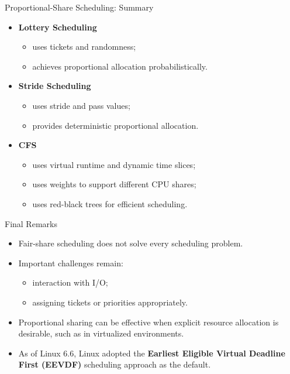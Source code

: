 \begin{frame}{Proportional-Share Scheduling: Summary}
    \begin{itemize}
        \item \textbf{Lottery Scheduling}
        \begin{itemize}
            \item uses tickets and randomness;
            \item achieves proportional allocation probabilistically.
        \end{itemize}

        \item \textbf{Stride Scheduling}
        \begin{itemize}
            \item uses stride and pass values;
            \item provides deterministic proportional allocation.
        \end{itemize}

        \item \textbf{CFS}
        \begin{itemize}
            \item uses virtual runtime and dynamic time slices;
            \item uses weights to support different CPU shares;
            \item uses red-black trees for efficient scheduling.
        \end{itemize}
    \end{itemize}
\end{frame}


\begin{frame}{Final Remarks}
    \begin{itemize}
        \item Fair-share scheduling does not solve every scheduling problem.
        \item Important challenges remain:
        \begin{itemize}
            \item interaction with I/O;
            \item assigning tickets or priorities appropriately.
        \end{itemize}
        \item Proportional sharing can be effective when explicit resource
        allocation is desirable, such as in virtualized environments.
        \item As of Linux 6.6, Linux adopted the
        \textbf{Earliest Eligible Virtual Deadline First (EEVDF)}
        scheduling approach as the default.
    \end{itemize}
\end{frame}


